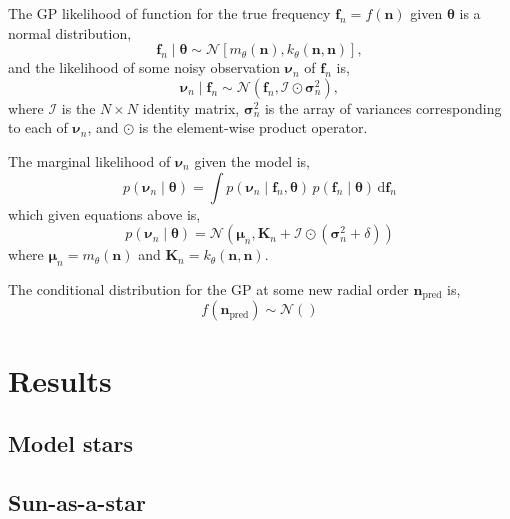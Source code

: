 \documentclass[linenumbers,modern]{aastex631}
\newcommand{\npred}{\bm n_\mathrm{pred}}
\newcommand{\dd}{\mathrm{d}}
\begin{document}
The GP likelihood of function for the true frequency \(\bm f_n = f(\bm n)\)
given \(\bm\theta\) is a normal distribution,
%
\begin{equation}
    \bm f_n \mid \bm\theta \sim
    \mathcal{N}\left[m_\theta(\bm n), k_\theta(\bm n, \bm n)\right],
\end{equation}
%
and the likelihood of some noisy observation \(\bm\nu_n\) of \(\bm f_n\) is,
%
\begin{equation}
    \bm\nu_n \mid \bm f_n \sim
    \mathcal{N}(\bm f_n, \bm{\mathcal{I}} \odot \bm\sigma_n^2),
\end{equation}
%
where \(\bm{\mathcal{I}}\) is the \(N \times N\) identity matrix,
\(\bm\sigma_n^2\) is the array of variances corresponding to each of
\(\bm\nu_n\), and \(\odot\) is the element-wise product operator.

The marginal likelihood of \(\bm\nu_n\) given the model is,
%
\begin{equation}
    p(\bm\nu_n \mid \bm\theta) = \int p(\bm\nu_n \mid \bm f_n, \bm\theta) \,
    p(\bm f_n \mid \bm\theta) \, \dd \bm f_n
\end{equation}
%
which given equations above is,
%
\begin{equation}
    p(\bm\nu_n \mid \bm\theta) =
    \mathcal{N}\left( 
        \bm\mu_n, \bm K_n + \bm{\mathcal{I}} \odot (\bm\sigma_n^2 + \delta)
    \right)
\end{equation}
%
where \(\bm\mu_n = m_\theta(\bm n)\) and \(\bm K_n = k_\theta(\bm n, \bm n)\).

The conditional distribution for the GP at some new radial order \(\npred\)
is,
%
\begin{equation}
    f(\npred) \sim \mathcal{N}\left(\right)
\end{equation}


\section{Results} \label{sec:results}



\subsection{Model stars} \label{sec:model-stars}



\subsection{Sun-as-a-star} \label{sec:sun}
\end{document}
